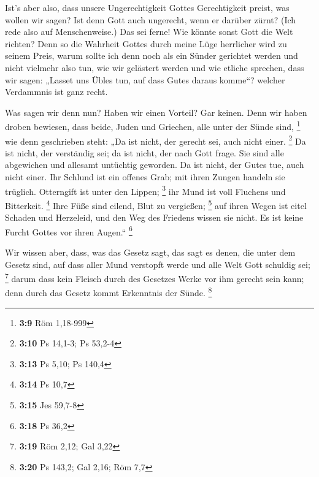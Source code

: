  Ist's aber also, dass unsere Ungerechtigkeit Gottes
Gerechtigkeit preist, was wollen wir sagen? Ist denn Gott auch
ungerecht, wenn er darüber zürnt? (Ich rede also auf Menschenweise.)
 Das sei ferne! Wie könnte sonst Gott die Welt richten?
 Denn so die Wahrheit Gottes durch meine Lüge herrlicher
wird zu seinem Preis, warum sollte ich denn noch als ein Sünder
gerichtet werden  und nicht vielmehr also tun, wie wir
gelästert werden und wie etliche sprechen, dass wir sagen: „Lasset uns
Übles tun, auf dass Gutes daraus komme``? welcher Verdammnis ist ganz
recht.

 Was sagen wir denn nun? Haben wir einen Vorteil? Gar
keinen. Denn wir haben droben bewiesen, dass beide, Juden und Griechen,
alle unter der Sünde sind, \footnote{\textbf{3:9} Röm 1,18-999}
 wie denn geschrieben steht: „Da ist nicht, der gerecht
sei, auch nicht einer. \footnote{\textbf{3:10} Ps 14,1-3; Ps 53,2-4}
 Da ist nicht, der verständig sei; da ist nicht, der nach
Gott frage.  Sie sind alle abgewichen und allesamt
untüchtig geworden. Da ist nicht, der Gutes tue, auch nicht einer.
 Ihr Schlund ist ein offenes Grab; mit ihren Zungen
handeln sie trüglich. Otterngift ist unter den Lippen; \footnote{\textbf{3:13}
  Ps 5,10; Ps 140,4}  ihr Mund ist voll Fluchens und
Bitterkeit. \footnote{\textbf{3:14} Ps 10,7}  Ihre Füße
sind eilend, Blut zu vergießen; \footnote{\textbf{3:15} Jes 59,7-8}
 auf ihren Wegen ist eitel Schaden und Herzeleid,
 und den Weg des Friedens wissen sie nicht.
 Es ist keine Furcht Gottes vor ihren Augen.``
\footnote{\textbf{3:18} Ps 36,2}

 Wir wissen aber, dass, was das Gesetz sagt, das sagt es
denen, die unter dem Gesetz sind, auf dass aller Mund verstopft werde
und alle Welt Gott schuldig sei; \footnote{\textbf{3:19} Röm 2,12; Gal
  3,22}  darum dass kein Fleisch durch des Gesetzes Werke
vor ihm gerecht sein kann; denn durch das Gesetz kommt Erkenntnis der
Sünde. \footnote{\textbf{3:20} Ps 143,2; Gal 2,16; Röm 7,7}

